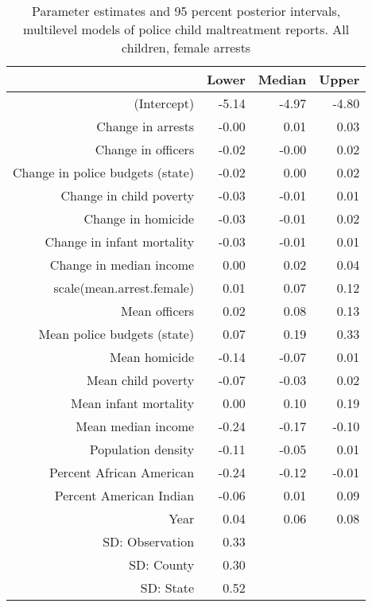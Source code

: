 \begin{table}[ht]
\centering
\begin{tabular}{rrrr}
  \hline
 & Lower & Median & Upper \\ 
  \hline
(Intercept) & -5.14 & -4.97 & -4.80 \\ 
  Change in arrests & -0.00 & 0.01 & 0.03 \\ 
  Change in officers & -0.02 & -0.00 & 0.02 \\ 
  Change in police budgets (state) & -0.02 & 0.00 & 0.02 \\ 
  Change in child poverty & -0.03 & -0.01 & 0.01 \\ 
  Change in homicide & -0.03 & -0.01 & 0.02 \\ 
  Change in infant mortality & -0.03 & -0.01 & 0.01 \\ 
  Change in median income & 0.00 & 0.02 & 0.04 \\ 
  scale(mean.arrest.female) & 0.01 & 0.07 & 0.12 \\ 
  Mean officers & 0.02 & 0.08 & 0.13 \\ 
  Mean police budgets (state) & 0.07 & 0.19 & 0.33 \\ 
  Mean homicide & -0.14 & -0.07 & 0.01 \\ 
  Mean child poverty & -0.07 & -0.03 & 0.02 \\ 
  Mean infant mortality & 0.00 & 0.10 & 0.19 \\ 
  Mean median income & -0.24 & -0.17 & -0.10 \\ 
  Population density & -0.11 & -0.05 & 0.01 \\ 
  Percent African American & -0.24 & -0.12 & -0.01 \\ 
  Percent American Indian & -0.06 & 0.01 & 0.09 \\ 
  Year & 0.04 & 0.06 & 0.08 \\ 
  SD: Observation & 0.33 &  &  \\ 
  SD: County & 0.30 &  &  \\ 
  SD: State & 0.52 &  &  \\ 
   \hline
\end{tabular}
\caption{Parameter estimates and 95 percent posterior intervals, multilevel models of 
             police child maltreatment reports. All children, female arrests} 
\end{table}
